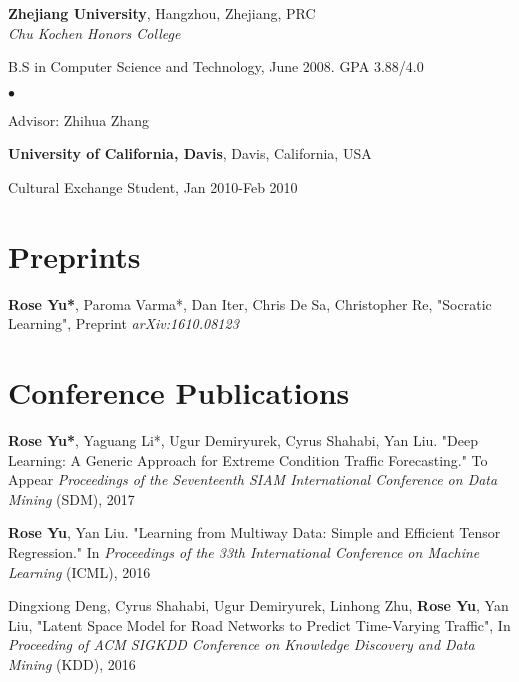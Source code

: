 \documentclass[margin,line]{res}
\newenvironment{list1}{
  \begin{list}{\ding{113}}{%
      \setlength{\itemsep}{0in}
      \setlength{\parsep}{0in} \setlength{\parskip}{0in}
      \setlength{\topsep}{0in} \setlength{\partopsep}{0in} 
      \setlength{\leftmargin}{0.17in}}}{\end{list}}
\newenvironment{list2}{
  \begin{list}{$\bullet$}{%
      \setlength{\itemsep}{0in}
      \setlength{\parsep}{0in} \setlength{\parskip}{0in}
      \setlength{\topsep}{0in} \setlength{\partopsep}{0in} 
      \setlength{\leftmargin}{0.2in}}}{\end{list}}
\begin{document}
\begin{resume}
{\bf Zhejiang University}, Hangzhou, Zhejiang, PRC\\
{\em Chu Kochen Honors College} 
\begin{list1}
\item[] B.S in Computer Science and Technology,  June 2008. GPA 3.88/4.0
\begin{list2}
\vspace*{.05in}
\item Advisor:  Zhihua Zhang
\end{list2}
\end{list1}

{\bf University of California, Davis}, Davis, California, USA\\
\vspace*{-.1in}
\begin{list1}
\item[] Cultural Exchange Student, Jan 2010-Feb 2010
\end{list1}




\section{\sc Preprints}
{\bf Rose Yu*}, Paroma Varma*, Dan Iter, Chris De Sa, Christopher Re,  "Socratic Learning",
Preprint \textit{ arXiv:1610.08123}

\section{\sc Conference Publications}

{\bf Rose Yu*}, Yaguang Li*, Ugur Demiryurek, Cyrus Shahabi, Yan Liu. "Deep Learning: A Generic Approach for Extreme Condition Traffic Forecasting." To Appear \textit{Proceedings  of the Seventeenth SIAM International Conference on Data Mining }(SDM),   2017

{\bf Rose Yu}, Yan Liu. "Learning from Multiway Data: Simple and Efficient Tensor Regression." In \textit{Proceedings  of the 33th International Conference on Machine Learning }(ICML),   2016

Dingxiong Deng, Cyrus Shahabi, Ugur Demiryurek, Linhong Zhu, {\bf Rose Yu}, Yan Liu, 
"Latent Space Model for Road Networks to Predict Time-Varying Traffic", In \textit{Proceeding of ACM SIGKDD Conference on Knowledge Discovery and Data Mining } (KDD), 2016



\end{resume}
\end{document}

